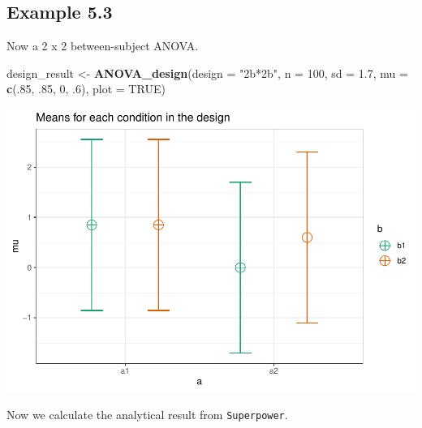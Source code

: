 \documentclass[]{book}
\newenvironment{Shaded}{\begin{snugshade}}{\end{snugshade}}
\newcommand{\DataTypeTok}[1]{\textcolor[rgb]{0.13,0.29,0.53}{#1}}
\newcommand{\DecValTok}[1]{\textcolor[rgb]{0.00,0.00,0.81}{#1}}
\newcommand{\FloatTok}[1]{\textcolor[rgb]{0.00,0.00,0.81}{#1}}
\newcommand{\KeywordTok}[1]{\textcolor[rgb]{0.13,0.29,0.53}{\textbf{#1}}}
\newcommand{\NormalTok}[1]{#1}
\newcommand{\OperatorTok}[1]{\textcolor[rgb]{0.81,0.36,0.00}{\textbf{#1}}}
\newcommand{\OtherTok}[1]{\textcolor[rgb]{0.56,0.35,0.01}{#1}}
\newcommand{\StringTok}[1]{\textcolor[rgb]{0.31,0.60,0.02}{#1}}
\begin{document}
\hypertarget{example-5.3}{%
\subsection{Example 5.3}\label{example-5.3}}

Now a 2 x 2 between-subject ANOVA.

\begin{Shaded}
\begin{Highlighting}[]
\NormalTok{design_result <-}\StringTok{ }\KeywordTok{ANOVA_design}\NormalTok{(}\DataTypeTok{design =} \StringTok{"2b*2b"}\NormalTok{,}
                              \DataTypeTok{n =} \DecValTok{100}\NormalTok{,}
                              \DataTypeTok{sd =} \FloatTok{1.7}\NormalTok{,}
                              \DataTypeTok{mu =} \KeywordTok{c}\NormalTok{(.}\DecValTok{85}\NormalTok{, }\FloatTok{.85}\NormalTok{, }
                                     \DecValTok{0}\NormalTok{, }\FloatTok{.6}\NormalTok{),}
                              \DataTypeTok{plot =} \OtherTok{TRUE}\NormalTok{)}
\end{Highlighting}
\end{Shaded}

\includegraphics{SuperpowerValidation_files/figure-latex/aberson_5.3.2-1.pdf}

Now we calculate the analytical result from \texttt{Superpower}.

\begin{Shaded}
\end{Shaded}
\end{document}
